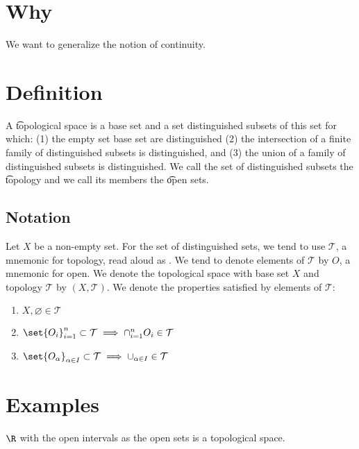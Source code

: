
\section*{Why}

We want to generalize the notion of continuity.

\section*{Definition}

A \t{topological space} is a base set and a set distinguished subsets of this set for which:
(1) the empty set base set are distinguished (2) the intersection of a finite family of distinguished subsets is distinguished, and (3) the union of a family of distinguished subsets is distinguished.
We call the set of distinguished subsets the \t{topology} and we call its members the \t{open sets}.

\subsection*{Notation}

Let $X$ be a non-empty set.
For the set of distinguished sets, we tend to use $\mathcal{T} $, a mnemonic for topology, read aloud as .
We tend to denote elements of $\mathcal{T} $ by $O$, a mnemonic for open.
We denote the topological space with base set $X$ and topology $\mathcal{T} $ by $(X, \mathcal{T} )$.
We denote the properties satisfied by elements of $\mathcal{T} $:
  \begin{enumerate}
  \item $X, \varnothing \in \mathcal{T} $
  \item $\set{O_i}_{i = 1}^{n} \subset \mathcal{T}  \implies \cap _{i = 1}^{n} O_i \in \mathcal{T} $
  \item $\set{O_\alpha }_{\alpha  \in I} \subset \mathcal{T} \implies \cup_{\alpha  \in I} \in \mathcal{T} $
  \end{enumerate}

\section*{Examples}

$\R $ with the open intervals as the open sets is a topological space.
